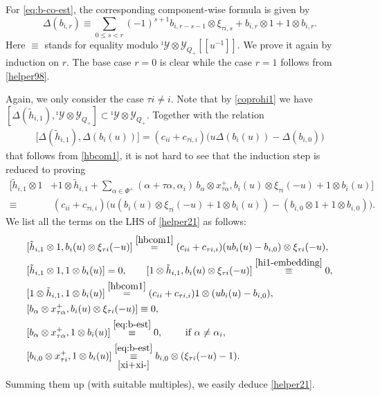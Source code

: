 \documentclass[11pt,reqno]{amsart}
\numberwithin{equation}{section}
\theoremstyle{definition}
\theoremstyle{remark}
\newcommand{\beq}{\begin{equation}}
\newcommand{\eeq}{\end{equation}}
\newcommand{\tl}{\tilde}
\newcommand{\lle}{\leqslant}
\newcommand{\Y}{{\mathscr{Y}}}
\newcommand{\Yi}{{^\imath\mathscr{Y}}}
\begin{document}
\subsubsection{} \label{sssec:copro-b}
For \eqref{eq:b-co-est}, the corresponding component-wise formula is given by 
\[
\Delta(b_{i,r})\equiv \sum_{0\lle s<r}(-1)^{s+1} b_{i,r-s-1}\otimes \xi_{\tau i,s}+b_{i,r}\otimes 1+1\otimes b_{i,r}.
\]
Here $\equiv$ stands for equality modulo $\Yi\otimes \Y_{Q_+}[\![u^{-1}]\!]$. We prove it again by induction on $r$. The base case $r=0$ is clear while the case $r=1$ follows from \eqref{helper98}. 

Again, we only consider the case $\tau i\ne i$.  Note that by \eqref{coprohi1} we have $[\Delta(\tilde{h}_{i,1}),\Yi\otimes \Y_{Q_+}]\subset \Yi\otimes \Y_{Q_+}$. Together with the relation 
\begin{align*}
\big[\Delta(\tl h_{i,1}),\Delta(b_i(u))\big]= (c_{ii}+c_{\tau i,i})\big(u\Delta(b_i(u))-\Delta(b_{i,0})\big)
\end{align*}
that follows from \eqref{hbcom1}, 
it is not hard to see that the induction step is reduced to proving
\beq\label{helper21}
\begin{split}
\Big[\tl h_{i,1}\otimes 1&+ 1\otimes \tl h_{i,1}+ \sum_{\alpha\in\Phi^+}(\alpha+\tau \alpha,\alpha_i)\,b_\alpha\otimes x_{\tau\alpha}^+,b_i(u)\otimes \xi_{\tau i}(-u)+1\otimes b_i(u)\Big]\\
\equiv &~(c_{ii}+c_{\tau i,i})\big(u(b_i(u)\otimes \xi_{\tau i}(-u)+1\otimes b_i(u))-(b_{i,0}\otimes 1+1\otimes b_{i,0})\big).
\end{split}
\eeq
We list all the terms on the LHS of \eqref{helper21} as follows:
\begin{align*}
&[\tl h_{i,1}\otimes 1, b_i(u)\otimes \xi_{\tau i}(-u)]\stackrel{\eqref{hbcom1}}{=}(c_{ii}+c_{\tau i,i})(ub_i(u)-b_{i,0})\otimes \xi_{\tau i}(-u),\\
&[\tl h_{i,1}\otimes 1, 1\otimes b_i(u)]=0,\qquad [1\otimes \tl h_{i,1}, b_i(u)\otimes \xi_{\tau i}(-u)]\stackrel{\eqref{hi1-embedding}}{\equiv}0,\\
&[1\otimes \tl h_{i,1}, 1\otimes b_i(u)]\stackrel{\eqref{hbcom1}}{=} (c_{ii}+c_{\tau i,i}) 1\otimes (ub_i(u)-b_{i,0}),\\
&[b_\alpha\otimes x_{\tau \alpha}^+,b_i(u)\otimes \xi_{\tau i}(-u)]\equiv 0,\\
&[b_\alpha\otimes x_{\tau \alpha}^+,1\otimes b_i(u)]\stackrel{\eqref{eq:b-est}}{\equiv} 0,\qquad \text{ if }\alpha\ne \alpha_{i},\\
&[b_{i,0}\otimes x_{\tau i}^+,1\otimes b_i(u)]\overset{\eqref{eq:b-est}}{\underset{\eqref{xi+xi-}}{\equiv}}b_{i,0}\otimes (\xi_{\tau i}(-u)-1).
\end{align*}
Summing them up (with suitable multiples), we easily deduce \eqref{helper21}.
\end{document}
